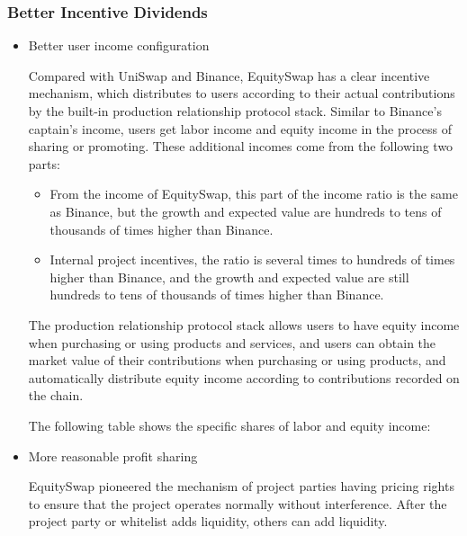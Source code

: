 \documentclass{article}
\begin{document}



\subsubsection{Better Incentive Dividends}

\begin{itemize}

\item Better user income configuration

Compared with UniSwap and Binance, EquitySwap has a clear incentive mechanism, which distributes to users according to their actual contributions by the built-in production relationship protocol stack. Similar to Binance's captain's income, users get labor income and equity income in the process of sharing or promoting. These additional incomes come from the following two parts:

\begin{itemize}
  \item From the income of EquitySwap, this part of the income ratio is the same as Binance, but the growth and expected value are hundreds to tens of thousands of times higher than Binance.
  \item Internal project incentives, the ratio is several times to hundreds of times higher than Binance, and the growth and expected value are still hundreds to tens of thousands of times higher than Binance.
\end{itemize}

The production relationship protocol stack allows users to have equity income when purchasing or using products and services, and users can obtain the market value of their contributions when purchasing or using products, and automatically distribute equity income according to contributions recorded on the chain.

The following table shows the specific shares of labor and equity income:



\item More reasonable profit sharing

EquitySwap pioneered the mechanism of project parties having pricing rights to ensure that the project operates normally without interference. After the project party or whitelist adds liquidity, others can add liquidity.


\end{itemize}
\end{document}
